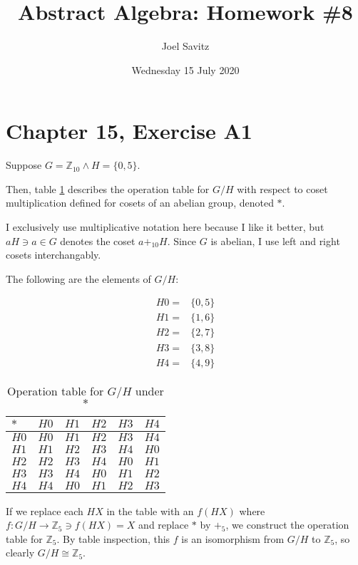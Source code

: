 \documentclass[12pt]{article}
\title{Abstract Algebra: Homework \#8}
\author{Joel Savitz}
\date{Wednesday 15 July 2020}
\newcommand{\ints}{\mathbb{Z}}
\begin{document}
\maketitle

\section{Chapter 15, Exercise A1}

Suppose $G = \ints_{10} \land H = \{ 0, 5 \}$.

Then, table \ref{t1} describes the operation table for $G/H$ with respect to coset multiplication defined for cosets of an abelian group, denoted $*$.

I exclusively use multiplicative notation here because I like it better, but $aH \ni a \in G$ denotes the coset $a +_{10} H$.
Since $G$ is abelian, I use left and right cosets interchangably.

The following are the elements of $G/H$:

\begin{align*}
	H0 = & \{ 0, 5 \} \\
	H1 = & \{ 1, 6 \} \\
	H2 = & \{ 2, 7 \} \\
	H3 = & \{ 3, 8 \} \\
	H4 = & \{ 4, 9 \}
\end{align*}

\begin{table}[!ht] 
\begin{tabular}{l|lllll}
	$*$ & $H0$ & $H1$ & $H2$ & $H3$ & $H4$	\\ \hline
	$H0$ & $H0$ & $H1$ & $H2$ & $H3$ & $H4$	\\
	$H1$ & $H1$ & $H2$ & $H3$ & $H4$ & $H0$	\\
	$H2$ & $H2$ & $H3$ & $H4$ & $H0$ & $H1$	\\
	$H3$ & $H3$ & $H4$ & $H0$ & $H1$ & $H2$	\\
	$H4$ & $H4$ & $H0$ & $H1$ & $H2$ & $H3$	\\
\end{tabular}
\centering
\caption{Operation table for $G/H$ under $*$}
\label{t1}
\end{table}

If we replace each $HX$ in the table with an $f(HX)$ where $f:G/H \to \ints_5 \ni f(HX) = X$ and replace $*$ by $+_5$,
we construct the operation table for $\ints_5$. By table inspection, this $f$ is an isomorphism from $G/H$ to $\ints_5$,
so clearly $G/H \cong \ints_5$.
\end{document}
